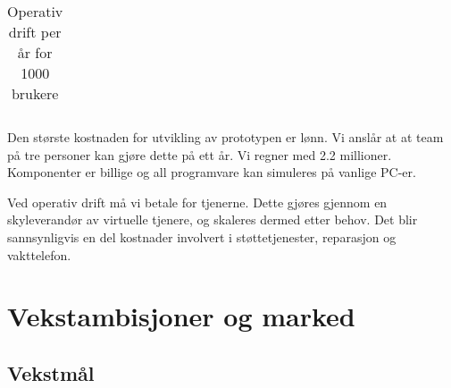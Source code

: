 
\begin{table}[h]
  \begin{tabular}{lr}
  \end{tabular}
  \caption{Operativ drift per år for 1000 brukere}
  \label{table.kostnad.drift}
\end{table}

Den største kostnaden for utvikling av prototypen er lønn. Vi anslår at at team
på tre personer kan gjøre dette på ett år. Vi regner med 2.2 millioner.
Komponenter er billige og all programvare kan simuleres på vanlige PC-er.

Ved operativ drift må vi betale for tjenerne. Dette gjøres gjennom en
skyleverandør av virtuelle tjenere, og skaleres dermed etter behov. Det blir
sannsynligvis en del kostnader involvert i støttetjenester, reparasjon og
vakttelefon.


\section{Vekstambisjoner og marked}


\subsection{Vekstmål}

